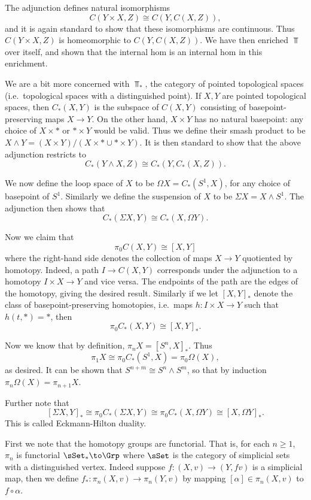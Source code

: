     The adjunction defines natural isomorphisms
    $$ C(Y\times X,Z) \cong C(Y,C(X,Z)) , $$
    and it is again standard to show that these isomorphisms are continuous.
    Thus $C(Y\times X,Z)$ is homeomorphic to $C(Y,C(X,Z))$.
    We have then enriched $\Top$ over itself, and shown that the internal hom is an internal hom in this enrichment.

    We are a bit more concerned with $\Top_*$, the category of pointed topological spaces (i.e.\ topological spaces with a distinguished point).
    If $X,Y$ are pointed topological spaces, then $C_*(X,Y)$ is the subspace of $C(X,Y)$ consisting of basepoint-preserving maps $X\to Y$.
    On the other hand, $X\times Y$ has no natural basepoint: any choice of $X\times*$ or $*\times Y$ would be valid.
    Thus we define their {\emphcolor smash product} to be $X\wedge Y=(X\times Y)/(X\times*\cup*\times Y)$.
    It is then standard to show that the above adjunction restricts to
    $$ C_*(Y\wedge X,Z) \cong C_*(Y,C_*(X,Z)) . $$

    We now define the {\emphcolor loop space} of $X$ to be $\Omega X=C_*(S^1,X)$, for any choice of basepoint of $S^1$.
    Similarly we define the {\emphcolor suspension} of $X$ to be $\Sigma X=X\wedge S^1$.
    The adjunction then shows that
    $$ C_*(\Sigma X,Y) \cong C_*(X,\Omega Y) . $$

    Now we claim that
    $$ \pi_0C(X,Y) \cong [X,Y] $$
    where the right-hand side denotes the collection of maps $X\to Y$ quotiented by homotopy.
    Indeed, a path $I\to C(X,Y)$ corresponds under the adjunction to a homotopy $I\times X\to Y$ and vice versa.
    The endpoints of the path are the edges of the homotopy, giving the desired result.
    Similarly if we let $[X,Y]_*$ denote the class of basepoint-preserving homotopies, i.e.\ maps $h\colon I\times X\to Y$ such that $h(t,*)=*$,
    then
    $$ \pi_0C_*(X,Y) \cong [X,Y]_* . $$

    Now we know that by definition, $\pi_nX=[S^n,X]_*$.
    Thus
    $$ \pi_1X \cong \pi_0C_*(S^1,X) = \pi_0\Omega(X) , $$
    as desired.
    It can be shown that $S^{n+m}\cong S^n\wedge S^m$, so that by induction $\pi_n\Omega(X)=\pi_{n+1}X$.

    Further note that
    $$ [\Sigma X,Y]_* \cong \pi_0C_*(\Sigma X,Y) \cong \pi_0C_*(X,\Omega Y) \cong [X,\Omega Y]_* . $$
    This is called {\emphcolor Eckmann-Hilton duality}.

\enote

First we note that the homotopy groups are functorial.
That is, for each $n\geq1$, $\pi_n$ is functorial $\sSet_*\to\Grp$ where $\sSet$ is the category of simplicial sets with a distinguished vertex.
Indeed suppose $f\colon(X,v)\to(Y,fv)$ is a simplicial map, then we define $f_*\colon\pi_n(X,v)\to\pi_n(Y,v)$ by mapping $[\alpha]\in\pi_n(X,v)$ to $f\circ\alpha$.

